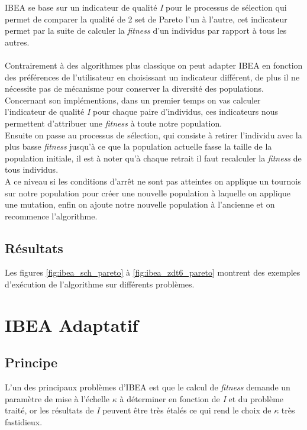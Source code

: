 \documentclass[12pt, letterpaper]{article}
\begin{document}
IBEA se base sur un indicateur de qualité \textit{I} pour le processus
de sélection qui permet de comparer la qualité de 2 set de Pareto
l'un à l'autre, cet indicateur permet par la suite de calculer la \textit{fitness}
d'un individus par rapport à tous les autres.\\
\\
Contrairement à des algorithmes plus classique on peut adapter IBEA en fonction
des préférences de l'utilisateur en choisissant un indicateur différent, de plus il
ne nécessite pas de mécanisme pour conserver la diversité des populations.
\\
Concernant son implémentions, dans un premier temps on vas calculer l'indicateur de qualité \textit{I} pour chaque paire d'individus, ces indicateurs
nous permettent d'attribuer une \textit{fitness} à toute notre population.\\
Ensuite on passe au processus de sélection, qui consiste à retirer l'individu
avec la plus basse \textit{fitness} jusqu'à ce que la population actuelle fasse la taille de
la population initiale, il est à noter qu'à chaque retrait il faut recalculer la \textit{fitness}
de tous individus.\\
A ce niveau si les conditions d'arrêt ne sont pas atteintes on applique un tournois sur notre population pour créer une nouvelle population à laquelle on applique une mutation, enfin on ajoute notre nouvelle population à l'ancienne et on recommence l'algorithme.

\subsection{Résultats}
Les figures \ref{fig:ibea_sch_pareto} à \ref{fig:ibea_zdt6_pareto}
montrent des exemples d'exécution de l'algorithme sur différents
problèmes.

\section{IBEA Adaptatif}

\subsection{Principe}

L'un des principaux problèmes d'IBEA est que le calcul de \textit{fitness} demande un paramètre de mise à l'échelle $\kappa$ à déterminer en fonction de \textit{I} et du problème traité, or les résultats de \textit{I} peuvent être très étalés ce qui rend
le choix de $\kappa$ très fastidieux.\\
\end{document}
